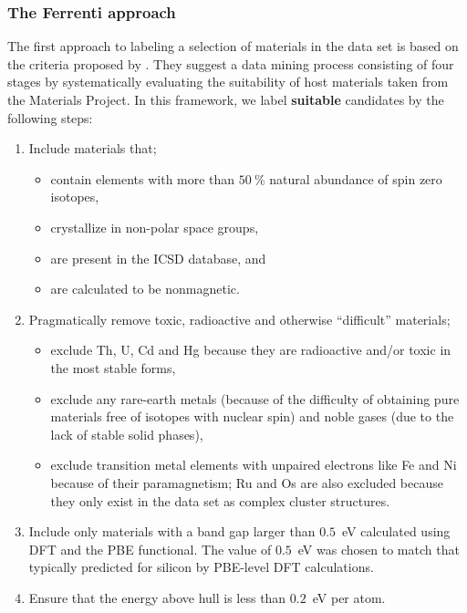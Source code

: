 \documentclass[superscriptaddress,unsortedaddress,
 amsmath,amssymb,
 aps,
]{revtex4-2}
\begin{document}
\subsubsection*{The Ferrenti approach}
The first approach to labeling a selection of materials in the data set is based on the criteria proposed by \citeauthor{Ferrenti2020} \cite{Ferrenti2020}.
They suggest a data mining process consisting of four stages by systematically evaluating the suitability of host materials taken from the Materials Project. In this framework, we label \textbf{suitable} candidates by the following steps: 
\begin{enumerate}
    \item Include materials that;
    \begin{itemize}
        \item contain elements with more than $50 \ \%$ natural abundance of spin zero isotopes,
        \item crystallize in non-polar space groups,
        \item are present in the ICSD database, 
        and
        \item are calculated to be nonmagnetic. 
    \end{itemize}
    \item Pragmatically remove toxic, radioactive and otherwise ``difficult'' materials;
    \begin{itemize}
        \item exclude Th, U, Cd and Hg because they are radioactive and/or toxic in the most stable forms,
        \item exclude any rare-earth metals (because of the difficulty of obtaining pure materials free of isotopes with nuclear spin) and noble gases (due to the lack of stable solid phases),
        \item exclude transition metal elements with unpaired electrons like Fe and Ni because of their paramagnetism; Ru and Os are also excluded because they only exist in the data set as complex cluster structures. 
    \end{itemize}
    \item Include only materials with a band gap larger than $0.5$~eV calculated using DFT and the PBE functional. The value of $0.5$~eV was chosen to match that typically predicted for silicon by PBE-level DFT calculations. 
    \item Ensure that the energy above hull is less than $0.2$~eV per atom.
\end{enumerate}
\end{document}
